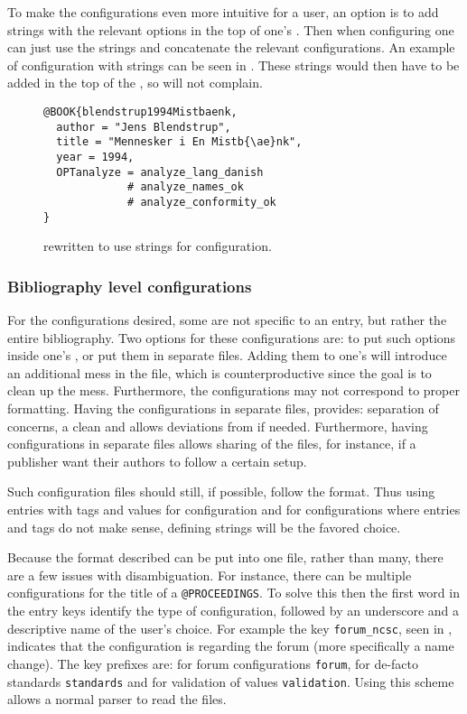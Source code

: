 To make the configurations even more intuitive for a {\bibtex} user,
an option is to add {\bibtex} strings with the relevant options in the
top of one's .  Then when configuring one can just use the
{\bibtex} strings and concatenate the relevant configurations.  An
example of configuration with strings can be seen in
.  These
strings would then have to be added in the top of the , so
{\bibtex} will not complain.

\begin{figure}
  \centering
\begin{verbatim}
@BOOK{blendstrup1994Mistbaenk,
  author = "Jens Blendstrup",
  title = "Mennesker i En Mistb{\ae}nk",
  year = 1994,
  OPTanalyze = analyze_lang_danish
             # analyze_names_ok
             # analyze_conformity_ok
}
\end{verbatim}
  \caption{
    rewritten to use strings for configuration.}
  \label{fig:analyzing_added_de_facto_standards_strings}
\end{figure}


\subsubsection{Bibliography level configurations}

For the configurations desired, some are not specific to an entry, but
rather the entire bibliography.  Two options for these configurations
are: to put such options inside one's , or put them in
separate files.  Adding them to one's  will introduce an
additional mess in the file, which is counterproductive since the goal
is to clean up the mess.  Furthermore, the configurations may not
correspond to proper {\bibtex} formatting.  Having the configurations
in separate files, provides: separation of concerns, a clean
 and allows deviations from {\bibtex} if needed.
Furthermore, having configurations in separate files allows sharing of
the files, for instance, if a publisher want their authors to follow a
certain setup.

Such configuration files should still, if possible, follow the
{\bibtex} format.  Thus using entries with tags and values for
configuration and for configurations where entries and tags do not
make sense, defining {\bibtex} strings will be the favored choice.

Because the format described can be put into one file, rather than
many, there are a few issues with disambiguation.  For instance, there
can be multiple configurations for the title of a
\texttt{@PROCEEDINGS}.  To solve this then the first word in the entry
keys identify the type of configuration, followed by an underscore and
a descriptive name of the user's choice.  For example the key
\texttt{forum\_ncsc}, seen in
, indicates that the
configuration is regarding the forum (more specifically a name
change).  The key prefixes are: for forum configurations
\texttt{forum}, for de-facto standards \texttt{standards} and for
validation of values \texttt{validation}.  Using this scheme allows a
normal {\bibtex} parser to read the files.

